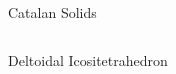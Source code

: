 \documentclass{beamer}
\begin{document}
\begin{frame}{Catalan Solids}
\begin{columns}
\begin{column}{0.32\textwidth}

      Deltoidal Icositetrahedron
     \end{column}
    \begin{column}{0.32\textwidth}
      \centering
      


\end{column}
\end{columns}
\end{frame}
\end{document}
